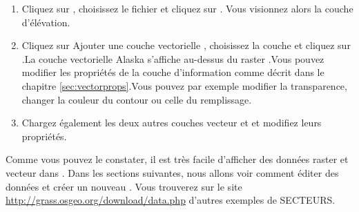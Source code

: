 \begin{enumerate}
  \item Cliquez sur , 
  choisissez le fichier  et cliquez sur . 
  Vous visionnez alors la couche d'élévation.
  \item Cliquez sur  {Ajouter une couche vectorielle \grass}, choisissez la couche  et cliquez sur .La couche vectorielle Alaska s'affiche au-dessus du raster .Vous pouvez modifier les propriétés de la couche d'information comme décrit dans le chapitre \ref{sec:vectorprops}.Vous pouvez par exemple modifier la transparence, changer la couleur du contour ou celle du remplissage.
  \item Chargez également les deux autres couches vecteur  et  et modifiez leurs propriétés.
\end{enumerate}

Comme vous pouvez le constater, il est très facile d'afficher des données \grass raster et vecteur dans \qg.  Dans les sections suivantes, nous allons voir comment éditer des données \grass et créer un nouveau .  Vous trouverez sur le site \grass \url{http://grass.osgeo.org/download/data.php} d'autres exemples de SECTEURS.


